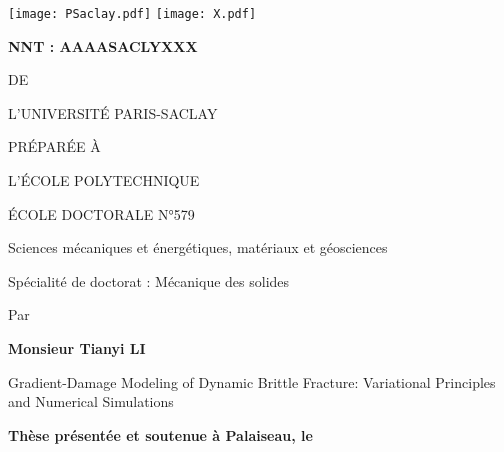 
\begin{titlepage}

\begin{flushleft}
\texttt{[image: PSaclay.pdf]} \hfill
\texttt{[image: X.pdf]}
\end{flushleft}
\vspace{10pt}

\begin{mdframed}
\begin{flushleft}
\large\textbf{NNT : AAAASACLYXXX}
\end{flushleft}
\vspace{20pt}

\begin{center}
{\color{color02}{\LARGE THÈSE DE DOCTORAT}

\vspace{8pt}
{\LARGE DE}

\vspace{8pt}
{\LARGE L'UNIVERSITÉ PARIS-SACLAY}

\vspace{8pt}
{\LARGE PRÉPARÉE À}

\vspace{8pt}
{\LARGE L'ÉCOLE POLYTECHNIQUE}}

\vspace{24pt}
{\Large ÉCOLE DOCTORALE N°579}

\vspace{5pt}
{\Large Sciences mécaniques et énergétiques, matériaux et géosciences}

\vspace{16pt}
{\Large Spécialité de doctorat : Mécanique des solides}
\vspace{12pt}

{\large Par}
\vspace{12pt}

{\LARGE\bfseries Monsieur Tianyi LI}
\vspace{20pt}

{\LARGE
Gradient-Damage Modeling of Dynamic Brittle Fracture: Variational Principles and Numerical Simulations}
\end{center}

\vfill
\begin{flushleft}
\large
\textbf{Thèse présentée et soutenue à Palaiseau, le}
\vspace{15pt}


\end{flushleft}
\end{mdframed}
\end{titlepage}
